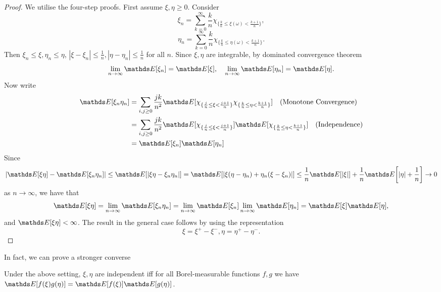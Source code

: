 \begin{proof}
We utilise the four-step proofs. First assume $\xi, \eta \ge 0$. Consider
\begin{equation*}
    \xi_n = \sum_{k=0}^\infty \frac{k}{n}\chi_{\{\frac{k}{n} \le \xi(\omega) < \frac{k+1}{n}\}},
\end{equation*}
\begin{equation*}
    \eta_n = \sum_{k=0}^\infty \frac{k}{n}\chi_{\{\frac{k}{n} \le \eta(\omega) < \frac{k+1}{n}\}}.
\end{equation*}
Then $\xi_n \le \xi, \eta_n \le \eta$, $|\xi - \xi_n|\le \frac{1}{n}, |\eta - \eta_n|\le \frac{1}{n}$ for all $n$. Since $\xi, \eta$ are integrable, by dominated convergence theorem
\begin{equation*}
    \lim_{n\rightarrow \infty} \E[\xi_n] = \E[\xi], \quad \lim_{n\rightarrow \infty} \E[\eta_n] = \E[\eta].
\end{equation*}
Now write
\begin{align*}
    \E[\xi_n \eta_n] &= \sum_{i,j \ge 0} \frac{jk}{n^2}\E[\chi_{\{ \frac{j}{n} \le \xi < \frac{j+1}{n}\}} \chi_{\{ \frac{k}{n} \le \eta < \frac{k+1}{n}\}}] \quad \text{(Monotone Convergence)}\\
    &= \sum_{i,j \ge 0} \frac{jk}{n^2} \E[\chi_{\{ \frac{j}{n} \le \xi < \frac{j+1}{n}\}}] \E[\chi_{\{ \frac{k}{n} \le \eta < \frac{k+1}{n}\}}]  \quad \text{(Independence)}\\
    &=\E[\xi_n]\E[\eta_n]
\end{align*}
Since 
\begin{equation*}
    |\E[\xi\eta]-\E[\xi_n \eta_n]| \le \E[|\xi \eta - \xi_n \eta_n|] = \E[|\xi(\eta - \eta_n)+ \eta_n(\xi - \xi_n)|] \le \frac{1}{n}\E[|\xi|]+\frac{1}{n}\E\bigg[|\eta|+\frac{1}{n}\bigg] \rightarrow 0
\end{equation*}
as $n \rightarrow \infty$, we have that
\begin{equation*}
    \E[\xi \eta] = \lim_{n \rightarrow \infty} \E[\xi_n \eta_n] = \lim_{n \rightarrow \infty} \E[\xi_n] \lim_{n \rightarrow \infty}\E[\eta_n] = \E[\xi] \E[\eta],
\end{equation*}
and $\E[\xi \eta] < \infty$. The result in the general case follows by using the representation $$\xi = \xi^+ - \xi^-, \eta = \eta^+ - \eta^-.$$
\end{proof}

In fact, we can prove a stronger converse
\begin{proposition} \label{prop:independence_by_product}
Under the above setting, $\xi,\eta$ are independent iff for all Borel-measurable functions $f,g$ we have $\E[f(\xi) g(\eta)] = \E[f(\xi)] \E[g(\eta)]$.
\end{proposition}

